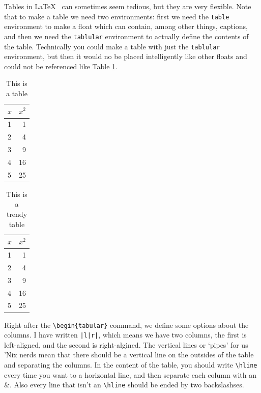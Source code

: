 \documentclass[twocolumn,10 pt,showpacs,preprintnumbers,amsmath,amssymb]{revtex4-1}%
\begin{document}
Tables in \LaTeX~ can sometimes seem tedious, but they are very flexible.  Note that
to make a table we need two environments: first we need the \verb_table_ environment
to make a float which can contain, among other things, captions, and then we need
the \verb_tablular_ environment to actually define the contents of the table.
Technically you could make a table with just the \verb_tablular_ environment, but
then it would no be placed intelligently like other floats and could not be referenced
like Table \ref{sqr}.
\begin{table}
  \caption{\label{sqr}This is a table}
  \begin{tabular}{|l|r|}
    \hline
    $x$  &  $x^2$\\
    \hline
      1    &  1\\
    \hline
      2    &  4\\
    \hline
      3    &  9\\
    \hline
      4    &  16\\
    \hline
      5    &  25\\
    \hline
  \end{tabular}
\end{table}
\begin{table}
  \caption{\label{trendy}This is a trendy table}
  \begin{tabular}{lr}
    \hline
    \hline
    $x$  &  $x^2$\\
    \hline
      1    &  1\\
    \hline
      2    &  4\\
    \hline
      3    &  9\\
    \hline
      4    &  16\\
    \hline
      5    &  25\\
    \hline
    \hline
  \end{tabular}
\end{table}
Right after the \verb_\begin{tabular}_ command, we define some options about the columns.
I have written \verb_|l|r|_, which means we have two columns, the first is left-aligned,
and the second is right-algined. The vertical lines or `pipes' for us 'Nix nerds mean that
there should be a vertical line on the outsides of the table and separating the columns.
In the content of the table, you should write \verb_\hline_ every time you want to a horizontal
line, and then separate each column with an \&. Also every line that isn't an \verb_\hline_
should be ended by two backslashses.
\end{document}
